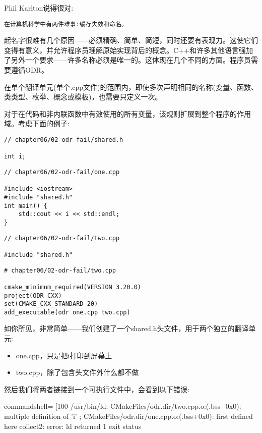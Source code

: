 
Phil Karlton说得很对:

\texttt{在计算机科学中有两件难事:缓存失效和命名。}

起名字很难有几个原因——必须精确、简单、简短，同时还要有表现力。这使它们变得有意义，并允许程序员理解原始实现背后的概念。C++和许多其他语言强加了另外一个要求——许多名称必须是唯一的。这体现在几个不同的方面。程序员需要遵循ODR。

在单个翻译单元(单个.cpp文件)的范围内，即使多次声明相同的名称(变量、函数、类类型、枚举、概念或模板)，也需要只定义一次。

对于在代码和非内联函数中有效使用的所有变量，该规则扩展到整个程序的作用域。考虑下面的例子:

\begin{lstlisting}[style=styleCXX]
// chapter06/02-odr-fail/shared.h

int i;
\end{lstlisting}

\begin{lstlisting}[style=styleCXX]
// chapter06/02-odr-fail/one.cpp

#include <iostream>
#include "shared.h"
int main() {
	std::cout << i << std::endl;
}
\end{lstlisting}

\begin{lstlisting}[style=styleCXX]
// chapter06/02-odr-fail/two.cpp
	
#include "shared.h"
\end{lstlisting}

\begin{lstlisting}[style=styleCMake]
# chapter06/02-odr-fail/two.cpp
	
cmake_minimum_required(VERSION 3.20.0)
project(ODR CXX)
set(CMAKE_CXX_STANDARD 20)
add_executable(odr one.cpp two.cpp)
\end{lstlisting}

如你所见，非常简单——我们创建了一个shared.h头文件，用于两个独立的翻译单元:

\begin{itemize}
\item 
one.cpp，只是把i打印到屏幕上

\item 
two.cpp，除了包含头文件外什么都不做
\end{itemize}

然后我们将两者链接到一个可执行文件中，会看到以下错误:

\begin{tcblisting}{commandshell={}}
[100%
/usr/bin/ld: CMakeFiles/odr.dir/two.cpp.o:(.bss+0x0): multiple
definition of 'i'
; CMakeFiles/odr.dir/one.cpp.o:(.bss+0x0): first defined here
collect2: error: ld returned 1 exit status
\end{tcblisting}

